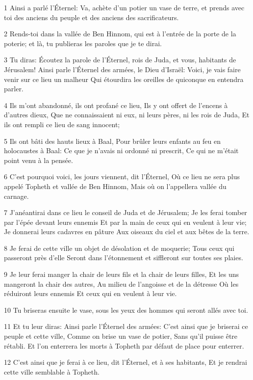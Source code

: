 \par 1 Ainsi a parlé l'Éternel: Va, achète d'un potier un vase de terre, et prends avec toi des anciens du peuple et des anciens des sacrificateurs.
\par 2 Rends-toi dans la vallée de Ben Hinnom, qui est à l'entrée de la porte de la poterie; et là, tu publieras les paroles que je te dirai.
\par 3 Tu diras: Écoutez la parole de l'Éternel, rois de Juda, et vous, habitants de Jérusalem! Ainsi parle l'Éternel des armées, le Dieu d'Israël: Voici, je vais faire venir sur ce lieu un malheur Qui étourdira les oreilles de quiconque en entendra parler.
\par 4 Ils m'ont abandonné, ils ont profané ce lieu, Ils y ont offert de l'encens à d'autres dieux, Que ne connaissaient ni eux, ni leurs pères, ni les rois de Juda, Et ils ont rempli ce lieu de sang innocent;
\par 5 Ils ont bâti des hauts lieux à Baal, Pour brûler leurs enfants au feu en holocaustes à Baal: Ce que je n'avais ni ordonné ni prescrit, Ce qui ne m'était point venu à la pensée.
\par 6 C'est pourquoi voici, les jours viennent, dit l'Éternel, Où ce lieu ne sera plus appelé Topheth et vallée de Ben Hinnom, Mais où on l'appellera vallée du carnage.
\par 7 J'anéantirai dans ce lieu le conseil de Juda et de Jérusalem; Je les ferai tomber par l'épée devant leurs ennemis Et par la main de ceux qui en veulent à leur vie; Je donnerai leurs cadavres en pâture Aux oiseaux du ciel et aux bêtes de la terre.
\par 8 Je ferai de cette ville un objet de désolation et de moquerie; Tous ceux qui passeront près d'elle Seront dans l'étonnement et siffleront sur toutes ses plaies.
\par 9 Je leur ferai manger la chair de leurs fils et la chair de leurs filles, Et les uns mangeront la chair des autres, Au milieu de l'angoisse et de la détresse Où les réduiront leurs ennemis Et ceux qui en veulent à leur vie.
\par 10 Tu briseras ensuite le vase, sous les yeux des hommes qui seront allés avec toi.
\par 11 Et tu leur diras: Ainsi parle l'Éternel des armées: C'est ainsi que je briserai ce peuple et cette ville, Comme on brise un vase de potier, Sans qu'il puisse être rétabli. Et l'on enterrera les morts à Topheth par défaut de place pour enterrer.
\par 12 C'est ainsi que je ferai à ce lieu, dit l'Éternel, et à ses habitants, Et je rendrai cette ville semblable à Topheth.

